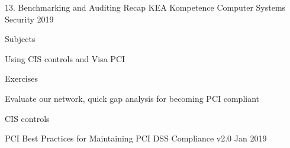 \documentclass[Screen16to9,17pt]{foils}
\begin{document}
\mytitlepage
{13. Benchmarking and Auditing Recap}
{KEA Kompetence Computer Systems Security 2019}



\begin{list1}
\item Subjects
\begin{list2}
\item Using CIS controls and Visa PCI
\end{list2}
\item Exercises
\begin{list2}
\item Evaluate our network, quick gap analysis for becoming PCI compliant
\end{list2}
\end{list1}




\begin{list1}
\item CIS controls
\item PCI Best Practices for Maintaining PCI DSS Compliance v2.0 Jan 2019
\end{list1}


\slidenext
\end{document}
